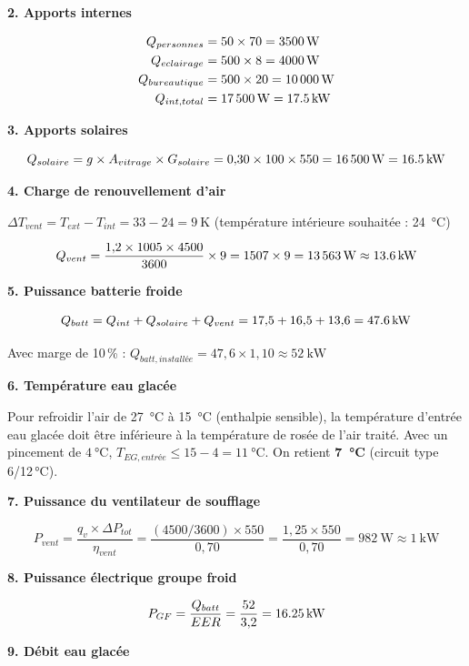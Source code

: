 \textbf{2. Apports internes}

\begin{align*}
  Q_{personnes} &= 50 \times 70 = \SI{3\,500}{\watt} \\
  Q_{eclairage} &= 500 \times 8 = \SI{4\,000}{\watt} \\
  Q_{bureautique}&= 500 \times 20 = \SI{10\,000}{\watt} \\
  Q_{int,total}  &= \SI{17\,500}{\watt} = \SI{17{,}5}{\kilo\watt}
\end{align*}

\textbf{3. Apports solaires}

$$Q_{solaire} = g \times A_{vitrage} \times G_{solaire} = 0{,}30 \times 100 \times 550 = \SI{16\,500}{\watt} = \SI{16{,}5}{\kilo\watt}$$

\textbf{4. Charge de renouvellement d'air}

$\Delta T_{vent} = T_{ext} - T_{int} = 33 - 24 = \SI{9}{\kelvin}$ (température intérieure souhaitée : \SI{24}{\celsius})

$$Q_{vent} = \frac{1{,}2 \times 1005 \times 4500}{3600} \times 9 = 1507 \times 9 = \SI{13\,563}{\watt} \approx \SI{13{,}6}{\kilo\watt}$$

\textbf{5. Puissance batterie froide}

$$Q_{batt} = Q_{int} + Q_{solaire} + Q_{vent} = 17{,}5 + 16{,}5 + 13{,}6 = \SI{47{,}6}{\kilo\watt}$$

Avec marge de 10\,\% : $Q_{batt,installée} = 47{,}6 \times 1{,}10 \approx \SI{52}{\kilo\watt}$

\textbf{6. Température eau glacée}

Pour refroidir l'air de \SI{27}{\celsius} à \SI{15}{\celsius} (enthalpie sensible), la température d'entrée eau glacée doit être inférieure à la température de rosée de l'air traité. Avec un pincement de $\SI{4}{\celsius}$, $T_{EG,entrée} \leq 15 - 4 = \SI{11}{\celsius}$. On retient \textbf{\SI{7}{\celsius}} (circuit type 6/12\,°C).

\textbf{7. Puissance du ventilateur de soufflage}

$$P_{vent} = \frac{q_v \times \Delta P_{tot}}{\eta_{vent}} = \frac{(4500/3600) \times 550}{0{,}70} = \frac{1{,}25 \times 550}{0{,}70} = \SI{982}{\watt} \approx \SI{1}{\kilo\watt}$$

\textbf{8. Puissance électrique groupe froid}

$$P_{GF} = \frac{Q_{batt}}{EER} = \frac{52}{3{,}2} = \SI{16{,}25}{\kilo\watt}$$

\textbf{9. Débit eau glacée}

